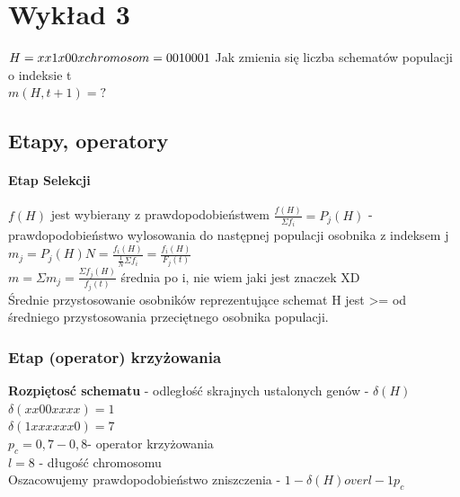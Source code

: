 \documentclass{article}
\begin{document}
	\section{Wykład 3}
		$H = xx1x00x\\
		chromosom = 0010001$
		Jak zmienia się liczba schematów populacji o indeksie t\\
		$m(H,t+1)=?$\\
		\subsection{Etapy, operatory}
			\paragraph{ Etap Selekcji } $f(H)$ jest wybierany z prawdopodobieństwem $\frac{f(H)} {\Sigma f_i} = P_j(H)$ - prawdopodobieństwo wylosowania do następnej populacji osobnika z indeksem j\\
			$m_j=P_j(H)N=\frac{f_i(H)}{\frac{1}{N}\Sigma f_i}=\frac{f_i(H)}{F_j(t)}$ \\
			$m = \Sigma m_j = \frac{\Sigma f_j(H)}{f_j(t)}$ średnia po i, nie wiem jaki jest znaczek XD\\
			
		
			Średnie przystosowanie osobników reprezentujące schemat H jest >= od średniego przystosowania przeciętnego osobnika populacji.
			\subsubsection{Etap (operator) krzyżowania} 
			\textbf{Rozpiętosć schematu} - odległość skrajnych ustalonych genów - $\delta(H)$\\
			$\delta (xx00xxxx)=1$\\
			$\delta (1xxxxxx0)=7$\\
			$p_c = 0,7 - 0,8 $- operator krzyżowania\\
			$l=8$ - długość chromosomu\\
			Oszacowujemy prawdopodobieństwo zniszczenia - $1 - \delta(H) over l-1 p_c$ \\
\end{document}

